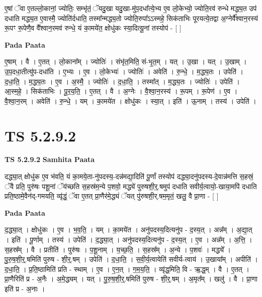 \documentclass[17pt]{extarticle}
\begin{document}
ए॒षां ॅवा ए॒तल्लो॒कानां॒ ज्योतिः॒ सम्भृ॑तं॒ ॅयदु॒खा यदु॒खा-मु॑प॒दधा᳚त्ये॒भ्य ए॒व लो॒केभ्यो॒ ज्योति॒रव॑ रुन्धे मद्ध्य॒त उप॑ दधाति मद्ध्य॒त ए॒वास्मै॒ ज्योति॑र्दधाति॒ तस्मा᳚न्मद्ध्य॒तो ज्योति॒रुपा᳚ऽऽस्महे॒ सिक॑ताभिः पूरयत्ये॒तद्वा अ॒ग्नेर्वै᳚श्वान॒रस्य॑ रू॒पꣳ रू॒पेणै॒व वै᳚श्वान॒रमव॑ रुन्धे॒ यं का॒मये॑त॒ क्षोधु॑कः स्या॒दित्यू॒नां तस्योप॑ - [  ] \newline

\textbf{Pada Paata} \newline

ए॒षाम् । वै । ए॒तत् । लो॒काना᳚म् । ज्योतिः॑ । संभृ॑त॒मिति॒ सं-भृ॒त॒म् । यत् । उ॒खा । यत् । उ॒खाम् । उ॒प॒दधा॒तीत्यु॑प-दधा॑ति । ए॒भ्यः । ए॒व । लो॒केभ्यः॑ । ज्योतिः॑ । अवेति॑ । रु॒न्धे॒ । म॒द्ध्य॒तः । उपेति॑ । द॒धा॒ति॒ । म॒द्ध्य॒तः । ए॒व । अ॒स्मै॒ । ज्योतिः॑ । द॒धा॒ति॒ । तस्मा᳚त् । म॒द्ध्य॒तः । ज्योतिः॑ । उपेति॑ । आ॒स्म॒हे॒ । सिक॑ताभिः । पू॒र॒य॒ति॒ । ए॒तत् । वै । अ॒ग्नेः । वै॒श्वा॒न॒रस्य॑ । रू॒पम् । रू॒पेण॑ । ए॒व । वै॒श्वा॒न॒रम् । अवेति॑ । रु॒न्धे॒ । यम् । का॒मये॑त । क्षोधु॑कः । स्या॒त् । इति॑ । ऊ॒नाम् । तस्य॑ । उपेति॑ ।  \newline





\section{ TS 5.2.9.2 }

\textbf{TS 5.2.9.2 } \newline
\textbf{Samhita Paata} \newline

दद्ध्या॒त् क्षोधु॑क ए॒व भ॑वति॒ यं का॒मये॒ता-नु॑पदस्य॒-दन्न॑मद्या॒दिति॑ पू॒र्णां तस्योप॑ दद्ध्या॒दनु॑पदस्य-दे॒वान्न॑मत्ति स॒हस्रं॒ ॅवै प्रति॒ पुरु॑षः पशू॒नां ॅय॑च्छति स॒हस्र॑म॒न्ये प॒शवो॒ मद्ध्ये॑ पुरुषशी॒र्॒.षमुप॑ दधाति सवीर्य॒त्वायो॒-खाया॒मपि॑ दधाति प्रति॒ष्ठामे॒वैन॑द्-गमयति॒ व्यृ॑द्धं॒ ॅवा ए॒तत् प्रा॒णैर॑मे॒द्ध्यं ॅयत् पु॑रुषशी॒र्.षम॒मृतं॒ खलु॒ वै प्रा॒णा - [  ] \newline

\textbf{Pada Paata} \newline

द॒द्ध्या॒त् । क्षोधु॑कः । ए॒व । भ॒व॒ति॒ । यम् । का॒मये॑त । अनु॑पदस्य॒दित्यनु॑प - द॒स्य॒त् । अन्न᳚म् । अ॒द्या॒त् । इति॑ । पू॒र्णाम् । तस्य॑ । उपेति॑ । द॒द्ध्या॒त् । अनु॑पदस्य॒दित्यनु॑प - द॒स्य॒त् । ए॒व । अन्न᳚म् । अ॒त्ति॒ । स॒हस्र᳚म् । वै । प्रतीति॑ । पुरु॑षः । प॒शू॒नाम् । य॒च्छ॒ति॒ । स॒हस्र᳚म् । अ॒न्ये । प॒शवः॑ । मद्ध्ये᳚ । पु॒रु॒ष॒शी॒र्॒.षमिति॑ पुरुष - शी॒र्॒.षम् । उपेति॑ । द॒धा॒ति॒ । स॒वी॒र्य॒त्वायेति॑ सवीर्य-त्वाय॑ । उ॒खाया᳚म् । अपीति॑ । द॒धा॒ति॒ । प्र॒ति॒ष्ठामिति॑ प्रति - स्थाम् । ए॒व । ए॒न॒त् । ग॒म॒य॒ति॒ । व्यृ॑द्ध॒मिति॒ वि - ऋ॒द्ध॒म् । वै । ए॒तत् । प्रा॒णैरिति॑ प्र - अ॒नैः । अ॒मे॒द्ध्यम् । यत् । पु॒रु॒ष॒शी॒र्॒.षमिति॑ पुरुष - शी॒र्॒.षम् । अ॒मृत᳚म् । खलु॑ । वै । प्रा॒णा इति॑ प्र - अ॒नाः ।  \newline
\end{document}
